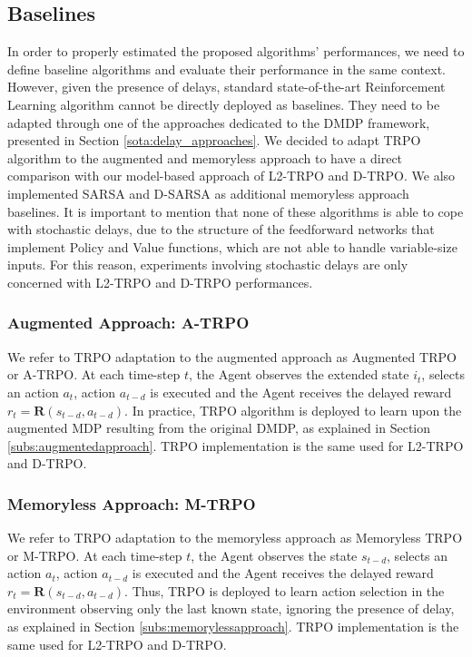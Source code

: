         \subsection{Baselines}
            In order to properly estimated the proposed algorithms' performances, we need to define baseline algorithms and evaluate their performance in the same context. However, given the presence of delays, standard state-of-the-art Reinforcement Learning algorithm cannot be directly deployed as baselines. They need to be adapted through one of the approaches dedicated to the DMDP framework, presented in Section \ref{sota:delay_approaches}. We decided to adapt TRPO algorithm to the augmented and memoryless approach to have a direct comparison with our model-based approach of L2-TRPO and D-TRPO. We also implemented SARSA and D-SARSA as additional memoryless approach baselines. \newline
            It is important to mention that none of these algorithms is able to cope with stochastic delays, due to the structure of the feedforward networks that implement Policy and Value functions, which are not able to handle variable-size inputs. For this reason, experiments involving stochastic delays are only concerned with L2-TRPO and D-TRPO performances.
            
            \subsubsection{Augmented Approach: A-TRPO}
                We refer to TRPO adaptation to the augmented approach as Augmented TRPO or A-TRPO. At each time-step $t$, the Agent observes the extended state $i_t$, selects an action $a_t$, action $a_{t-d}$ is executed and the Agent receives the delayed reward $r_t = \mathbf{R}(s_{t-d}, a_{t-d})$. In practice, TRPO algorithm is deployed to learn upon the augmented MDP resulting from the original DMDP, as explained in Section \ref{subs:augmentedapproach}. TRPO implementation is the same used for L2-TRPO and D-TRPO.
                
            \subsubsection{Memoryless Approach: M-TRPO}
                We refer to TRPO adaptation to the memoryless approach as Memoryless TRPO or M-TRPO. At each time-step $t$, the Agent observes the state $s_{t-d}$, selects an action $a_t$, action $a_{t-d}$ is executed and the Agent receives the delayed reward $r_t = \mathbf{R}(s_{t-d}, a_{t-d})$. Thus, TRPO is deployed to learn action selection in the environment observing only the last known state, ignoring the presence of delay, as explained in Section \ref{subs:memorylessapproach}. TRPO implementation is the same used for L2-TRPO and D-TRPO.
                
